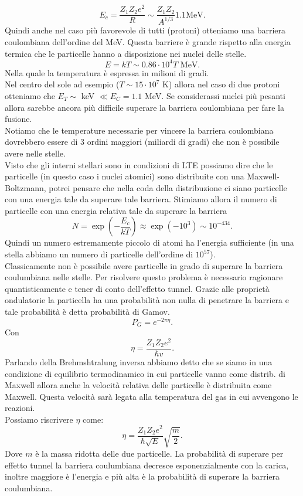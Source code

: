 \[
E_c =\frac{Z_1Z_2e^2}{R}\sim \frac{Z_1Z_2}{A^{1 /3}} 1.1 \text{MeV}
.\] 
Quindi anche nel caso più favorevole di tutti (protoni) otteniamo una barriera coulombiana dell'ordine del MeV. Questa barriere è grande rispetto alla energia termica che le particelle hanno a disposizione nei nuclei delle stelle.
\[
E = kT \sim 0.86 \cdot 10^{4}T \text{ MeV} 
.\] 
Nella quale la temperatura è espressa in milioni di gradi.\\
Nel centro del sole ad esempio ($T\sim 15\cdot 10^7$ K) allora nel caso di due protoni otteniamo che $E_T\sim $ keV $\ll E_C = 1.1$ MeV. Se considerassi nuclei più pesanti allora sarebbe ancora più difficile superare la barriera coulombiana per fare la fusione.\\
Notiamo che le temperature necessarie per vincere la barriera coulombiana dovrebbero essere di 3 ordini maggiori (miliardi di gradi) che non è possibile avere nelle stelle.\\
Visto che gli interni stellari sono in condizioni di LTE possiamo dire che le particelle (in questo caso i nuclei atomici) sono distribuite con una Maxwell-Boltzmann, potrei pensare che nella coda della distribuzione ci siano particelle con una energia tale da superare tale barriera. 
Stimiamo allora il numero di particelle con una energia relativa tale da superare la barriera
\[
    N = \exp\left(-\frac{E_c}{kT}\right)\approx \exp\left(-10^3\right)
    \sim 10^{-434}
.\] 
Quindi un numero estremamente piccolo di atomi ha l'energia sufficiente (in una stella abbiamo un numero di particelle dell'ordine di $10^{57}$).\\
Classicamente non è possibile avere particelle in grado di superare la barriera coulumbiana nelle stelle. Per risolvere questo problema è necessario ragionare quantisticamente e tener di conto dell'effetto tunnel.
Grazie alle proprietà ondulatorie la particella ha una probabilità non nulla di penetrare la barriera e tale probabilità è detta probabilità di Gamov.\\
\[
P_G = e^{-2\pi \eta}
.\] 
Con 
\[
\eta = \frac{Z_1Z_2 e^2}{\hbar  v}
.\] 
Parlando della Brehmshtralung inversa abbiamo detto che se siamo in una condizione di equilibrio termodinamico in cui particelle vanno come distrib. di Maxwell allora anche la velocità relativa delle particelle è distribuita come Maxwell. Questa velocità sarà legata alla temperatura del gas in cui avvengono le reazioni. \\
Possiamo riscrivere $\eta$  come:
\[
\eta = \frac{Z_1Z_2e^2}{\hbar \sqrt{E}}\sqrt{\frac{m}{2}} 
.\] 
Dove $m$ è la massa ridotta delle due particelle. La probabilità di superare per effetto tunnel la barriera coulumbiana decresce esponenzialmente con la carica, inoltre maggiore è l'energia e più alta è la probabilità di superare la barriera coulumbiana.\\
